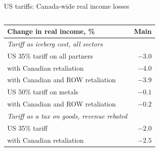 \documentclass[aspectratio=169,9pt,t]{beamer}
\begin{document}
\begin{frame}{US tariffs: Canada-wide real income losses}
  \begin{columns}[T]
    \begin{column}{0.56\textwidth}
      \small
      \begin{tabular}{@{}L{0.72\textwidth}r@{}}
        \toprule
        Change in real income, \% & Main\\
        \midrule
        \emph{Tariff as iceberg cost, all sectors}\\
        US 35\% tariff on all partners & $-3.0$\\
        \quad with Canadian retaliation & $-4.0$\\
        \quad with Canadian and ROW retaliation & $-3.9$\\
        US 50\% tariff on metals & $-0.1$\\
        \quad with Canadian and ROW retaliation & $-0.2$\\
        \addlinespace
        \emph{Tariff as a tax on goods, revenue rebated}\\
        US 35\% tariff & $-2.0$\\
        \quad with Canadian retaliation & $-2.5$\\
        \bottomrule
      \end{tabular}


\end{column}
\end{columns}
\end{frame}
\end{document}
